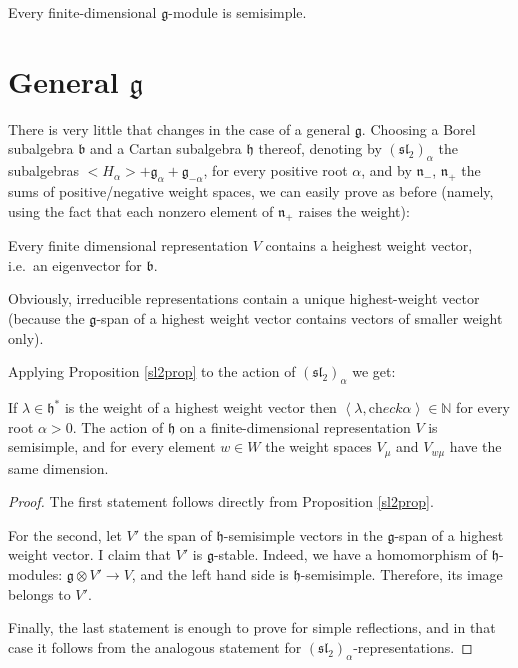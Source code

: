 \begin{proposition}\label{completereducibility}
 Every finite-dimensional $\mathfrak g$-module is semisimple.
\end{proposition}


\section{General $\mathfrak g$}

There is very little that changes in the case of a general $\mathfrak g$. Choosing a Borel subalgebra $\mathfrak b$ and a Cartan subalgebra $\mathfrak h$ thereof, denoting by $(\mathfrak{sl}_2)_\alpha$ the subalgebras $<H_\alpha>+\mathfrak g_\alpha+\mathfrak g_{-\alpha}$, for every positive root $\alpha$, and by $\mathfrak n_-$, $\mathfrak n_+$ the sums of positive/negative weight spaces, we can easily prove as before (namely, using the fact that each nonzero element of $\mathfrak n_+$ raises the weight):

\begin{lemma}
 Every finite dimensional representation $V$ contains a heighest weight vector, i.e.\ an eigenvector for $\mathfrak b$.
\end{lemma}

Obviously, irreducible representations contain a unique highest-weight vector (because the $\mathfrak g$-span of a highest weight vector contains vectors of smaller weight only).

Applying Proposition \ref{sl2prop} to the action of $(\mathfrak{sl}_2)_\alpha$ we get:

\begin{proposition}
 If $\lambda\in \mathfrak h^*$ is the weight of a highest weight vector then $\left<\lambda,\text{ch}eck\alpha\right>\in \mathbb N$ for every root $\alpha>0$. The action of $\mathfrak h$ on a finite-dimensional representation $V$ is semisimple, and for every element $w\in W$ the weight spaces $V_\mu$ and $V_{w\mu}$ have the same dimension.
\end{proposition}

\begin{proof}
The first statement follows directly from Proposition \ref{sl2prop}. 

For the second, let $V'$ the span of $\mathfrak h$-semisimple vectors in the $\mathfrak g$-span of a highest weight vector. I claim that $V'$ is $\mathfrak g$-stable. Indeed, we have a homomorphism of $\mathfrak h$-modules: $\mathfrak g\otimes V'\to V$, and the left hand side is $\mathfrak h$-semisimple. Therefore, its image belongs to $V'$.

Finally, the last statement is enough to prove for simple reflections, and in that case it follows from the analogous statement for $(\mathfrak{sl}_2)_\alpha$-representations.
\end{proof}


